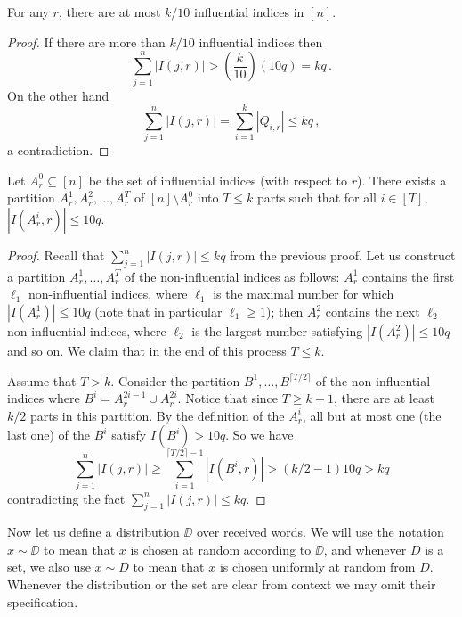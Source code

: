 \begin{lemma}\label{lem:inf} For any $r$, there are at most $k/10$ influential indices in $[n]$.
\end{lemma}

\begin{proof} If there are more than $k/10$
influential indices then 
\[
\sum_{j=1}^n |I(j,r)|  > \left(\frac{k}{10}\right)(10 q) = kq\,.
\]
On the other hand 
\[
\sum_{j=1}^n |I(j,r)| =
\sum_{i=1}^k |Q_{i,r}| \leq kq\,,
\]
a contradiction.
\end{proof}

\begin{lemma}\label{lem:partition} Let $A_r^0 \subseteq [n]$ be the set of influential indices (with respect to $r$). There exists a partition $A_r^1, A_r^2, \dots, A_r^T$ of $[n] \setminus A_r^0$ into $T\leq k$ parts such that for all $i \in [T]$, $|I(A_r^i,r)| \leq  10q$.
\end{lemma}

\begin{proof} Recall that $\sum_{j=1}^n |I(j,r)| \leq kq$ from the previous proof. Let us construct a partition $A_r^1, \dots, A_r^T$ of the non-influential indices as follows: $A_r^1$ contains the first $\ell_1$ non-influential indices, where $\ell_1$ is the maximal number for which $|I(A_r^1)| \leq 10q$ (note that in particular $\ell_1\geq 1$); then $A_r^2$ contains the next $\ell_2$ non-influential indices, where $\ell_2$ is the largest number satisfying $|I(A_r^2)| \leq 10q$ and so on. We claim that in the end of this process $T \leq k$.

Assume that $T > k$. Consider the partition $B^1,\ldots ,B^{\lceil T/2 \rceil}$ of the non-influential indices where $B^i = A_r^{2i - 1} \cup A_r^{2i}$. Notice that since $T \geq k+1$, there are at least $k/2$ parts in this partition. By the definition of the 
%
%
%
$A_r^i$, 
all but at most one (the last one) of the 
%
$B^i$
satisfy $I(B^i) > 10q$. So we have $$\sum_{j=1}^n |I(j,r)| \geq \sum_{i=1}^{\lceil T/2\rceil -1} |I(B^i,r)| > (k/2 -1) 10q > kq$$ contradicting the fact $\sum_{j=1}^n |I(j,r)| \leq kq$.
\end{proof}

%
%
%

Now let us define a distribution $\DD$ over received words. We will use the notation $x\sim\DD$ to mean that $x$ is chosen at random according to $\DD$, and whenever $D$ is a set, we also use $x\sim D$ to mean that $x$ is chosen uniformly at random from $D$. Whenever the distribution or the set are clear from context we may omit their specification.

